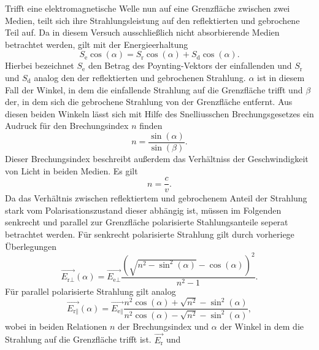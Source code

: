 \noindent
Trifft eine elektromagnetische Welle nun auf eine Grenzfläche zwischen zwei Medien, teilt sich ihre Strahlungsleistung auf den reflektierten und gebrochene Teil auf.
Da in diesem Versuch ausschließlich nicht absorbierende Medien betrachtet werden, gilt mit der Energieerhaltung
\begin{equation}
    S_\text{e} \cos(\alpha) = S_\text{r} \cos(\alpha) + S_\text{d} \cos(\alpha).
\end{equation}
Hierbei bezeichnet $S_\text{e}$ den Betrag des Poynting-Vektors der einfallenden und $S_\text{r}$ und $S_\text{d}$ analog den der reflektierten und gebrochenen Strahlung.
$\alpha$ ist in diesem Fall der Winkel, in dem die einfallende Strahlung auf die Grenzfläche trifft und $\beta$ der, in dem sich die gebrochene Strahlung von der Grenzfläche
entfernt.
\newline
Aus diesen beiden Winkeln lässt sich mit Hilfe des Snelliusschen Brechungsgesetzes ein Audruck für den Brechungsindex $n$ finden
\begin{equation}
    n = \frac{\sin(\alpha)}{\sin(\beta)}.
\end{equation}
Dieser Brechungsindex beschreibt außerdem das Verhältniss der Geschwindigkeit von Licht in beiden Medien. Es gilt
\begin{equation}
    n = \frac{c}{v}.
\end{equation}
\newline\newline
Da das Verhältnis zwischen reflektiertem und gebrochenem Anteil der Strahlung stark vom Polarisationszustand dieser abhängig ist, müssen im Folgenden senkrecht und
parallel zur Grenzfläche polarisierte Stahlungsanteile seperat betrachtet werden.
Für senkrecht polarisierte Strahlung gilt durch vorheriege Überlegungen
\begin{equation}
    \vec{E_{\text{r}\perp}}(\alpha) = \vec{E_{\text{e}\perp}} \frac{(\sqrt{n^2 - \sin^2(\alpha)} - \cos(\alpha))^2}{n^2 - 1}.
    \label{eqn:fresnelsenk}
\end{equation}
Für parallel polarisierte Strahlung gilt analog
\begin{equation}
    \vec{E_{\text{r}\parallel}}(\alpha) = \vec{E_{\text{e}\parallel}} \frac{n^2 \cos(\alpha) + \sqrt{n^2} - \sin^2(\alpha)}{n^2 \cos(\alpha) - \sqrt{n^2} - \sin^2(\alpha)},
    \label{eqn:fresnelpara}
\end{equation}
wobei in beiden Relationen $n$ der Brechungsindex und $\alpha$ der Winkel in dem die Strahlung auf die Grenzfläche trifft ist. $\vec{E_{\text{r}}}$ und

